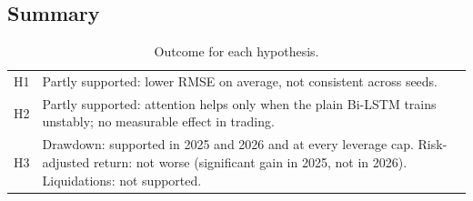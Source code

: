 \subsection{Summary}
\begin{table}[ht]
  \centering
  \caption{Outcome for each hypothesis.}
  \label{tab:scorecard}
  \small
  \begin{tabularx}{\textwidth}{lX}
    \toprule
    H1 & Partly supported: lower RMSE on average, not consistent across seeds. \\
    H2 & Partly supported: attention helps only when the plain Bi-LSTM trains unstably; no measurable effect in trading. \\
    H3 & Drawdown: supported in 2025 and 2026 and at every leverage cap. Risk-adjusted return: not worse (significant gain in 2025, not in 2026). Liquidations: not supported. \\
    \bottomrule
  \end{tabularx}
\end{table}
